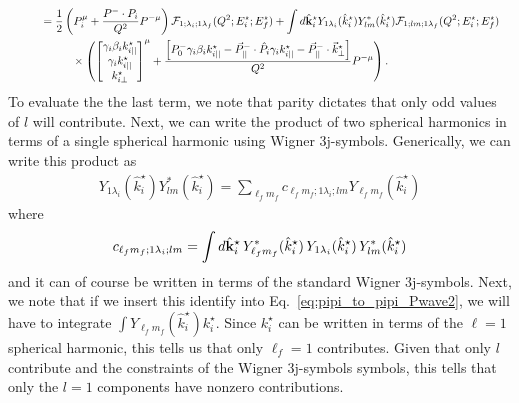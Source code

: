 \begin{align}
\nonumber\\
&\hspace{1cm}=
\frac{1}{2}\left(
P^\mu_i
+
\frac{P^-\cdot P_i}{Q^2} P^{-\mu}\right)
\mathcal{F}_{1;\lambda_i;1 \lambda_f}(Q^2;E_i^\star;E_f^\star)
+\int d\hat{\bf k}^\star_i
{Y_{1\lambda_i}(\hat{k}_i^\star)}
Y^*_{lm}(\hat{k}_i^\star)
 \mathcal{F}_{1;l m;1\lambda_f}(Q^2;E_i^\star;E_f^\star)
\nonumber\\
&\hspace{2cm}\times
\left(
\begin{bmatrix} 
\gamma_i\beta_ik_{i||}^\star\\
\gamma_i k_{i||}^\star\\
 k^\star_{i\perp}
 \end{bmatrix}^\mu
+
\frac{\left[P^-_0\gamma_i \beta_ik_{i||}^\star-\vec{P}^-_{||}\cdot\hat{P}_i \gamma_i k_{i||}^\star - \vec{P}^-_{||}\cdot\vec{k}^\star_\perp\right]}{Q^2} P^{-\mu}\right).
\label{eq:pipi_to_pipi_Pwave2}
\end{align}
To evaluate the the last term, we note that parity dictates that only odd values of $l$ will contribute. Next, we can write the product of two spherical harmonics in terms of a single spherical harmonic using Wigner 3j-symbols. Generically, we can write this product as
\begin{align}
{Y_{1\lambda_i}(\hat{k}_i^\star)}
Y^*_{lm}(\hat{k}_i^\star)
=
\sum_{\ell_fm_f}
c_{\ell_fm_f;1\lambda_i;lm}
Y_{\ell_fm_f}(\hat{k}_i^\star)
\end{align}
where
\begin{align}
c_{\ell_fm_f;1\lambda_i;lm}
=\int d\hat{\bf k}^\star_i \, Y^*_{\ell_fm_f}(\hat{k}_i^\star)
\,{Y_{1\lambda_i}(\hat{k}_i^\star)}
\,Y^*_{lm}(\hat{k}_i^\star)
\end{align}
and it can of course be written in terms of the standard Wigner 3j-symbols. Next, we note that if we insert this identify into Eq.~\ref{eq:pipi_to_pipi_Pwave2}, we will have to integrate $\int Y_{\ell_fm_f}(\hat{k}_i^\star) k^\star_i$. Since $k^\star_i$ can be written in terms of the $\ell=1$ spherical harmonic, this tells us that only $\ell_f=1$ contributes. Given that only $l$ contribute and the constraints of the Wigner 3j-symbols symbols, this tells that only the $l=1$ components have nonzero contributions. 

